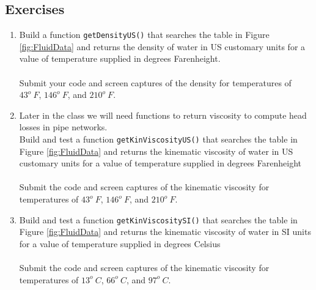 \subsection{Exercises}
\begin{enumerate}
\item Build a function \texttt{getDensityUS()} that searches the table in Figure \ref{fig:FluidData} and returns the density of water in US customary units for a value of temperature supplied in degrees Farenheight. \\~\\
Submit your code and screen captures of the density for temperatures of $43^o~F$, $146^o~F$, and $210^o~F$.

\item Later in the class we will need functions to return viscosity to compute head losses in pipe networks.  \\

 Build and test a function \texttt{getKinViscosityUS()} that searches the table in Figure \ref{fig:FluidData} and returns the kinematic viscosity of water in US customary units for a value of temperature supplied in degrees Farenheight\\~\\
Submit the code and screen captures of the kinematic viscosity for temperatures of $43^o~F$, $146^o~F$, and $210^o~F$. 

\item Build and test a function \texttt{getKinViscositySI()} that searches the table in Figure \ref{fig:FluidData} and returns the kinematic viscosity of water in SI units for a value of temperature supplied in degrees Celsius \\~\\
Submit the code and screen captures of the kinematic viscosity for temperatures of $13^o~C$, $66^o~C$, and $97^o~C$.
\end{enumerate}
